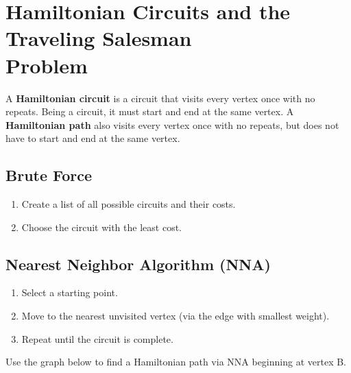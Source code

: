 \newpage

\section{Hamiltonian Circuits and the Traveling Salesman \\ Problem}%
\label{sec:hamiltonian-circuits}

\begin{definition}
  A \textbf{Hamiltonian circuit} is a circuit that visits every vertex
  once with no repeats. Being a circuit, it must start and end at the
  same vertex. A \textbf{Hamiltonian path} also visits every vertex
  once with no repeats, but does not have to start and end at the same
  vertex.
\end{definition}



\subsection{Brute Force}%
\label{sub:brute-force}

\begin{algorithm}
  \begin{enumerate}
  \item Create a list of all possible circuits and their costs.
  \item Choose the circuit with the least cost.
  \end{enumerate}
\end{algorithm}

\subsection{Nearest Neighbor Algorithm (NNA)}%
\label{sub:nearest-neighbor}

\begin{algorithm}
  \begin{enumerate}
  \item Select a starting point.
  \item Move to the nearest unvisited vertex (via the edge with
    smallest weight).
  \item Repeat until the circuit is complete.
  \end{enumerate}
\end{algorithm}

\begin{exercise}\label{ex:nna}
  Use the graph below to find a Hamiltonian path via NNA beginning at
  vertex B.

  

\end{exercise}

